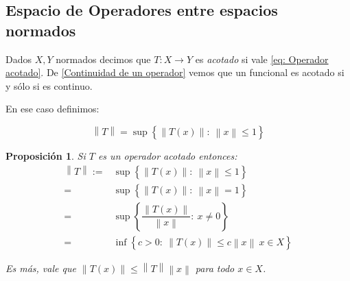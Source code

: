 \documentclass[11pt]{article}
\newcommand{\norm}[1]{\left\lVert#1\right\rVert}
\newcommand{\sett}[1]{\left\lbrace#1\right\rbrace}
\numberwithin{theorem}{subsection}
\newtheorem{proposition}[theorem]{Proposici\'on}
\newenvironment{definition}[1][Definici\'on]{\begin{trivlist}
		\item[\hskip \labelsep {\bfseries #1}]}{\end{trivlist}}
\begin{document}
\subsection{Espacio de Operadores entre espacios normados}

\begin{definition}
	Dados $X,Y$ normados decimos que $T : X \rightarrow Y$ es \textit{acotado} si vale \ref{eq: Operador acotado}. De \ref{Continuidad de un operador} vemos que un funcional es acotado si y s\'olo si es continuo.
	
	En ese caso definimos:
	
	\begin{equation*}
	\norm{T} = \sup \sett{\norm{T(x)}: \ \norm{x} \leq 1}
	\end{equation*}
	
\end{definition}

\begin{proposition}
	Si $T$ es un operador acotado entonces:
	\begin{equation}
	\label{eq: Normas equivalentes de un operador}
	\begin{aligned}
	\norm{T} := & \sup \sett{\norm{T(x)}: \ \norm{x} \leq 1} \\
	= & \sup \sett{\norm{T(x)}: \ \norm{x} = 1}\\
	= & \sup \sett{\dfrac{\norm{T(x)}}{\norm{x}}: \ x \neq 0}  \\
	= & \inf \sett{c > 0: \ \norm{T(x)} \leq c \norm{x} \ x \in X} 
	\end{aligned}	
	\end{equation}
	
	Es m\'as, vale que $\norm{T(x)} \leq \norm{T} \norm{x}$ para todo $x \in X$.
	
\end{proposition}
\end{document}
